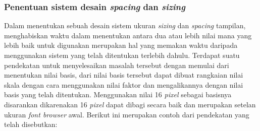 \subsubsection{Penentuan sistem desain \textit{spacing} dan \textit{sizing }}
%
%
%
%

Dalam menentukan sebuah desain sistem ukuran \textit{sizing} dan \textit{spacing} tampilan, menghabiskan waktu dalam menentukan antara dua atau lebih nilai mana yang lebih baik untuk digunakan merupakan hal yang memakan waktu daripada menggunakan sistem yang telah ditentukan terlebih dahulu. Terdapat suatu pendekatan untuk menyelesaikan masalah tersebut dengan memulai dari menentukan nilai basis, dari nilai basis tersebut dapat dibuat rangkaian nilai skala dengan cara menggunakan nilai faktor dan mengalikannya dengan nilai basis yang telah ditentukan. Menggunakan nilai 16 \textit{pixel} sebagai basisnya disarankan dikarenakan 16 \textit{pixel} dapat dibagi secara baik dan merupakan setelan ukuran \textit{font browser} awal. Berikut ini merupakan contoh dari pendekatan yang telah disebutkan:

